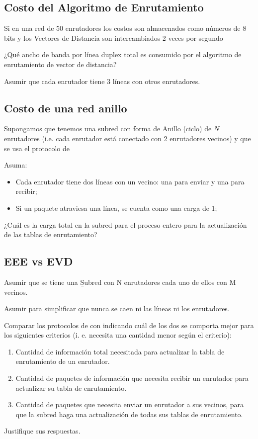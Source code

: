 \documentclass[12pt]{report}
\begin{document}
\begin{exer}
\subsection{Costo del Algoritmo de Enrutamiento \sthree}
Si en una red de 50 enrutadores los costos son almacenados como números de 8 bits y los
Vectores de Distancia son intercambiados 2 veces por segundo

¿Qué ancho de banda por línea duplex total es consumido por el algoritmo de enrutamiento de vector de distancia?

Asumir que cada enrutador tiene 3 líneas con otros enrutadores.
\end{exer}

\begin{exer}
\subsection{Costo de una red anillo \sthree}
Supongamos que tenemos una subred con forma de Anillo (ciclo) de $N$ enrutadores (i.e.
cada enrutador está conectado con 2 enrutadores vecinos) y que se usa el protocolo de 

Asuma:
\begin{itemize}
\item Cada enrutador tiene dos líneas con un vecino: una para enviar y una para recibir;
\item Si un paquete atraviesa una línea, se cuenta como una carga de 1;
\end{itemize}
¿Cuál es la carga total en la subred para el proceso entero para la actualización de las tablas
de enrutamiento?
\end{exer}

\begin{exer}
\subsection{EEE vs EVD \sthree}
Asumir que se tiene una \b{Subred con N enrutadores cada uno de ellos con M vecinos}.

Asumir para simplificar que nunca se caen ni las líneas ni los enrutadores.

Comparar los protocolos de  con  indicando cuál de los dos se comporta mejor para los siguientes criterios (i. e. necesita
una cantidad menor según el criterio):

\begin{enumerate}
\item Cantidad de información total necesitada para actualizar la tabla de enrutamiento de un
enrutador.
\item Cantidad de paquetes de información que necesita recibir un enrutador para actualizar
su tabla de enrutamiento.
\item Cantidad de paquetes que necesita enviar un enrutador a sus vecinos, para que la subred
haga una actualización de todas sus tablas de enrutamiento.
\end{enumerate}
 
Justifique sus respuestas.
\end{exer}
\end{document}
